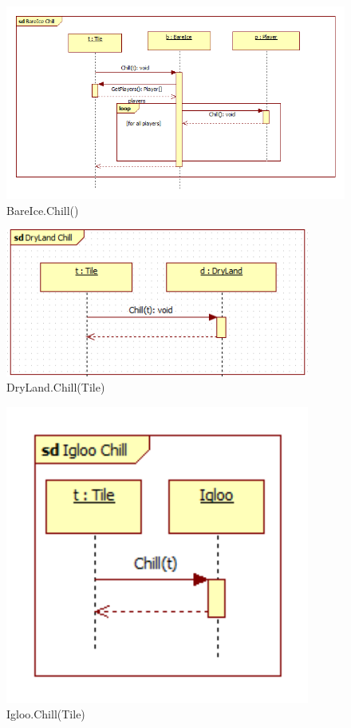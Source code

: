 \begin{figure}[H]
	\begin{center}
		\includegraphics[width=15cm]{chapters/chapter04/seqdiag/BareIce_Chill.png}
		\caption{BareIce.Chill()}
		\label{fig:BareIceChill}
	\end{center}
\end{figure}
\begin{figure}[H]
	\begin{center}
		\includegraphics[width=10cm]{chapters/chapter04/seqdiag/DryLand_Chill.png}
		\caption{DryLand.Chill(Tile)}
		\label{fig:DryLandChill}
	\end{center}
\end{figure}
\begin{figure}[H]
	\begin{center}
		\includegraphics[width=10cm]{chapters/chapter04/seqdiag/Igloo_Chill.png}
		\caption{Igloo.Chill(Tile)}
		\label{fig:IglooChill}
	\end{center}
\end{figure}

